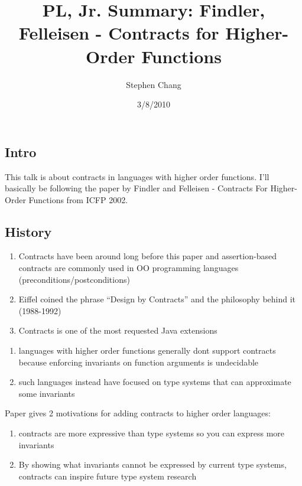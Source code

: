 \documentclass[12pt]{article}	%
\begin{document}
\title{PL, Jr. Summary: Findler, Felleisen - Contracts for Higher-Order Functions}
\author{Stephen Chang}
\date{3/8/2010}
\maketitle

\newcommand{\oblig}[4]{ \ensuremath{ #1^{#2,#3,#4} } }


\subsection*{Intro}

This talk is about contracts in languages with higher order functions. I'll basically be following the paper by Findler and Felleisen - Contracts For Higher-Order Functions from ICFP 2002.


\subsection*{History}

\begin{enumerate}
	\item Contracts have been around long before this paper and assertion-based contracts are commonly used in OO programming languages (preconditions/postconditions)
	\item Eiffel coined the phrase ``Design by Contracts'' and the philosophy behind it (1988-1992)
	\item Contracts is one of the most requested Java extensions
\end{enumerate}

\begin{enumerate}
	\item languages with higher order functions generally dont support contracts because enforcing invariants on function arguments is undecidable
	\item such languages instead have focused on type systems that can approximate some invariants 
\end{enumerate}

Paper gives 2 motivations for adding contracts to higher order languages:
\begin{enumerate}
	\item contracts are more expressive than type systems so you can express more invariants
	\item By showing what invariants cannot be expressed by current type systems, contracts can inspire future type system research
\end{enumerate}
\end{document}

